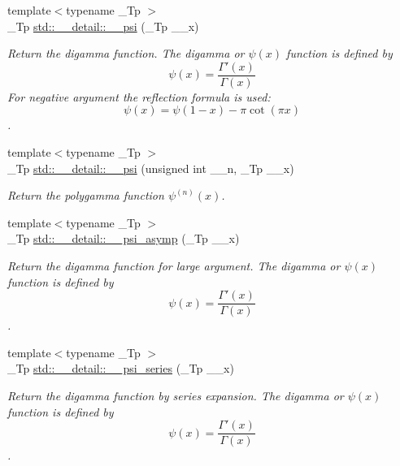 \begin{DoxyCompactItemize}
{\footnotesize template$<$typename \+\_\+\+Tp $>$ }\\\+\_\+\+Tp \hyperlink{namespacestd_1_1____detail_ad7246a3ca90be800e6cc79c8e2360abd}{std\+::\+\_\+\+\_\+detail\+::\+\_\+\+\_\+psi} (\+\_\+\+Tp \+\_\+\+\_\+x)
\begin{DoxyCompactList}\small\item\em Return the digamma function. The digamma or $ \psi(x) $ function is defined by \[ \psi(x) = \frac{\Gamma'(x)}{\Gamma(x)} \] For negative argument the reflection formula is used\+: \[ \psi(x) = \psi(1-x) - \pi \cot(\pi x) \]. \end{DoxyCompactList}\item 
{\footnotesize template$<$typename \+\_\+\+Tp $>$ }\\\+\_\+\+Tp \hyperlink{namespacestd_1_1____detail_a96d6b8301ca54615364a53665b347f6c}{std\+::\+\_\+\+\_\+detail\+::\+\_\+\+\_\+psi} (unsigned int \+\_\+\+\_\+n, \+\_\+\+Tp \+\_\+\+\_\+x)
\begin{DoxyCompactList}\small\item\em Return the polygamma function $ \psi^{(n)}(x) $. \end{DoxyCompactList}\item 
{\footnotesize template$<$typename \+\_\+\+Tp $>$ }\\\+\_\+\+Tp \hyperlink{namespacestd_1_1____detail_a2557b5d815b6667bc9228c1e8a2a16ae}{std\+::\+\_\+\+\_\+detail\+::\+\_\+\+\_\+psi\+\_\+asymp} (\+\_\+\+Tp \+\_\+\+\_\+x)
\begin{DoxyCompactList}\small\item\em Return the digamma function for large argument. The digamma or $ \psi(x) $ function is defined by \[ \psi(x) = \frac{\Gamma'(x)}{\Gamma(x)} \]. \end{DoxyCompactList}\item 
{\footnotesize template$<$typename \+\_\+\+Tp $>$ }\\\+\_\+\+Tp \hyperlink{namespacestd_1_1____detail_a378e78e1c3c08b8f146acf32a26e831a}{std\+::\+\_\+\+\_\+detail\+::\+\_\+\+\_\+psi\+\_\+series} (\+\_\+\+Tp \+\_\+\+\_\+x)
\begin{DoxyCompactList}\small\item\em Return the digamma function by series expansion. The digamma or $ \psi(x) $ function is defined by \[ \psi(x) = \frac{\Gamma'(x)}{\Gamma(x)} \]. \end{DoxyCompactList}\end{DoxyCompactItemize}
